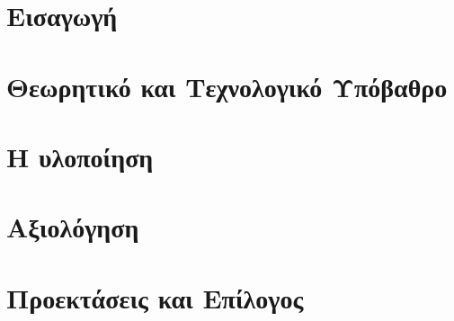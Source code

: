 \documentclass[a4paper,11pt,twoside]{book}
\author{\me}
\begin{document}
\setcounter{page}{3}



\clearemptydoublepage



\clearemptydoublepage



\clearemptydoublepage



\clearemptydoublepage



\clearemptydoublepage



\clearemptydoublepage

\pagestyle{fancy}

\tableofcontents
\clearemptydoublepage
\listoffigures
\clearemptydoublepage
\listoftables
\clearemptydoublepage


\setcounter{page}{1}

\mainmatter
\chapter{Εισαγωγή}\label{ch:introduction}

\clearemptydoublepage

\chapter{Θεωρητικό και Τεχνολογικό Υπόβαθρο}\label{ch:technicalAndTheoreticalBg}

\clearemptydoublepage

\chapter{Η υλοποίηση}\label{ch:implementation}

\clearemptydoublepage

\chapter{Αξιολόγηση}\label{ch:experiment}

\clearemptydoublepage

\chapter{Προεκτάσεις και Επίλογος}\label{ch:epilogue}

\clearemptydoublepage
\end{document}
